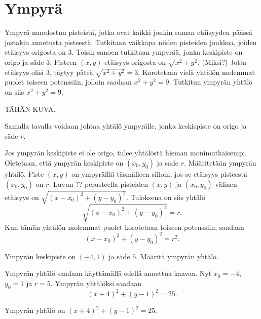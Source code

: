 \section{Ympyrä}


Ympyrä muodostuu pisteistä, jotka ovat kaikki jonkin saman etäisyyden päässä jostakin annetusta pisteestä. Tutkitaan vaikkapa niiden pisteiden joukkoa, joiden etäisyys origosta on 3. Toisin sanoen tutkitaan ympyrää, jonka keskipiste on origo ja säde 3. Pisteen $(x,y)$ etäisyys origosta on $\sqrt{x^2+y^2}$. (Miksi?) Jotta etäisyys olisi 3, täytyy päteä $\sqrt{x^2+y^2}=3$. Korotetaan vielä yhtälön molemmat puolet toiseen potenssiin, jolloin saadaan $x^2+y^2=9$. Tutkitun ympyrän yhtälö on siis $x^2+y^2=9$.

TÄHÄN KUVA.

Samalla tavalla voidaan johtaa yhtälö ympyrälle, jonka keskispiste on origo ja säde $r$.

Jos ympyrän keskipiste ei ole origo, tulee yhtälöstä hieman monimutkaisempi. Oletetaan, että ympyrän keskipiste on $(x_0,y_0)$ ja säde $r$. Määritetään ympyrän yhtälö. Piste $(x,y)$ on ympyrälllä täsmälleen silloin, jos se etäisyys pisteestä $(x_0,y_0)$ on $r$. Luvun ?? perusteella pisteiden $(x,y)$ ja $(x_0,y_0)$ välinen etäisyys on $\sqrt{(x-x_0)^2+(y-y_0)^2}$. Tuloksena on siis yhtälö
\[
\sqrt{(x-x_0)^2+(y-y_0)^2}=r.
\]
Kun tämän yhtälön molemmat puolet korotetaan toiseen potenssiin, saadaan
\[
(x-x_0)^2+(y-y_0)^2=r^2.
\]


\begin{esimerkki}
Ympyrän keskipiste on $(-4,1)$ ja säde $5$. Määritä ympyrän yhtälö.
\begin{esimratk}
Ympyrän yhtälö saadaan käyttämällä edellä annettua kaavaa. Nyt $x_0=-4$, $y_0=1$ ja $r=5$. Ympyrän yhtälöksi saadaan
\[
(x+4)^2+(y-1)^2=25.
\]
\end{esimratk}
\begin{esimvast}
Ympyrän yhtälö on $(x+4)^2+(y-1)^2=25$.
\end{esimvast}
\end{esimerkki}

